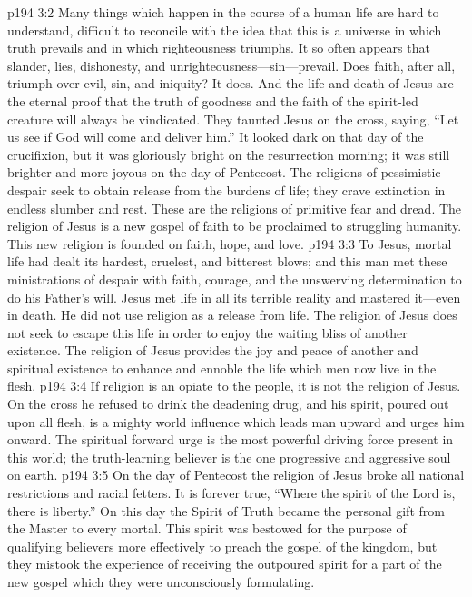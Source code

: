 \vs p194 3:2 Many things which happen in the course of a human life are hard to understand, difficult to reconcile with the idea that this is a universe in which truth prevails and in which righteousness triumphs. It so often appears that slander, lies, dishonesty, and unrighteousness---sin---prevail. Does faith, after all, triumph over evil, sin, and iniquity? It does. And the life and death of Jesus are the eternal proof that the truth of goodness and the faith of the spirit\hyp{}led creature will always be vindicated. They taunted Jesus on the cross, saying, “Let us see if God will come and deliver him.” It looked dark on that day of the crucifixion, but it was gloriously bright on the resurrection morning; it was still brighter and more joyous on the day of Pentecost. The religions of pessimistic despair seek to obtain release from the burdens of life; they crave extinction in endless slumber and rest. These are the religions of primitive fear and dread. The religion of Jesus is a new gospel of faith to be proclaimed to struggling humanity. This new religion is founded on faith, hope, and love.
\vs p194 3:3 To Jesus, mortal life had dealt its hardest, cruelest, and bitterest blows; and this man met these ministrations of despair with faith, courage, and the unswerving determination to do his Father’s will. Jesus met life in all its terrible reality and mastered it---even in death. He did not use religion as a release from life. The religion of Jesus does not seek to escape this life in order to enjoy the waiting bliss of another existence. The religion of Jesus provides the joy and peace of another and spiritual existence to enhance and ennoble the life which men now live in the flesh.
\vs p194 3:4 If religion is an opiate to the people, it is not the religion of Jesus. On the cross he refused to drink the deadening drug, and his spirit, poured out upon all flesh, is a mighty world influence which leads man upward and urges him onward. The spiritual forward urge is the most powerful driving force present in this world; the truth\hyp{}learning believer is the one progressive and aggressive soul on earth.
\vs p194 3:5 On the day of Pentecost the religion of Jesus broke all national restrictions and racial fetters. It is forever true, “Where the spirit of the Lord is, there is liberty.” On this day the Spirit of Truth became the personal gift from the Master to every mortal. This spirit was bestowed for the purpose of qualifying believers more effectively to preach the gospel of the kingdom, but they mistook the experience of receiving the outpoured spirit for a part of the new gospel which they were unconsciously formulating.
